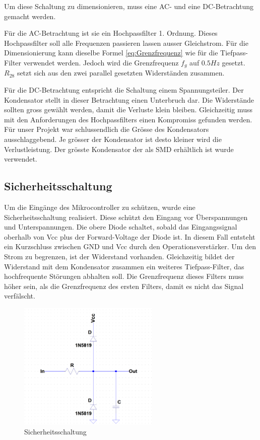 Um diese Schaltung zu dimensionieren, muss eine AC- und eine DC-Betrachtung gemacht werden.


Für die AC-Betrachtung ist sie ein Hochpassfilter 1. Ordnung. Dieses Hochpassfilter soll alle Frequenzen passieren lassen ausser Gleichstrom. Für die Dimensionierung kann dieselbe Formel \eqref{eq:Grenzfrequenz} wie für die Tiefpass-Filter verwendet werden. Jedoch wird die Grenzfrequenz $f_g$ auf $0.5 Hz$ gesetzt. $R_{28}$ setzt sich aus den  zwei parallel gesetzten Widerständen zusammen.


Für die DC-Betrachtung entspricht die Schaltung einem Spannungsteiler. Der Kondensator stellt in dieser Betrachtung einen Unterbruch dar. Die Widerstände sollten gross gewählt werden, damit die Verluste klein bleiben. Gleichzeitig muss mit den Anforderungen des Hochpassfilters einen Kompromiss gefunden werden. Für unser Projekt war schlussendlich die Grösse des Kondensators ausschlaggebend. Je grösser der Kondensator ist desto kleiner wird die Verlustleistung. Der grösste Kondensator der als SMD\cite{wikiSMD} erhältlich ist wurde verwendet.

\subsection{Sicherheitsschaltung}

Um die Eingänge des Mikrocontroller zu schützen, wurde eine Sicherheitsschaltung realisiert. Diese schützt den Eingang vor Überspannungen und Unterspannungen. Die obere Diode schaltet, sobald das Eingangssignal oberhalb von Vcc plus der Forward-Voltage der Diode ist. In diesem Fall entsteht ein Kurzschluss zwischen GND und Vcc durch den Operationsverstärker. Um den Strom zu begrenzen, ist der Widerstand vorhanden. Gleichzeitig bildet der Widerstand mit dem Kondensator zusammen ein weiteres Tiefpass-Filter, das hochfrequente Störungen abhalten soll.  Die Grenzfrequenz dieses Filters muss höher sein, als die Grenzfrequenz des ersten Filters, damit es nicht das Signal verfälscht.


\begin{figure}[H]
\begin{center}
\includegraphics[width=0.6\textwidth]{images/Analoge_Schaltung_Sicherung.png}
\caption{Sicherheitsschaltung}
\label{fig:Sicherheitsschaltung}
\end{center}
\end{figure}

